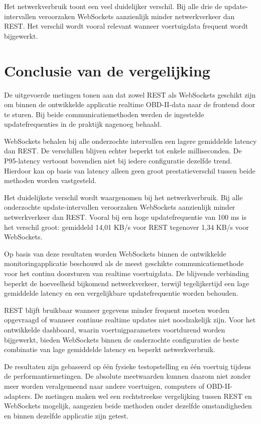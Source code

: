Het netwerkverbruik toont een veel duidelijker verschil. Bij alle drie de
update-intervallen veroorzaken WebSockets aanzienlijk minder netwerkverkeer dan
REST. Het verschil wordt vooral relevant wanneer voertuigdata frequent wordt
bijgewerkt.


\section{Conclusie van de vergelijking}

De uitgevoerde metingen tonen aan dat zowel REST als WebSockets geschikt zijn
om binnen de ontwikkelde applicatie realtime OBD-II-data naar de frontend door
te sturen. Bij beide communicatiemethoden werden de ingestelde
updatefrequenties in de praktijk nagenoeg behaald.

WebSockets behalen bij alle onderzochte intervallen een lagere gemiddelde
latency dan REST. De verschillen blijven echter beperkt tot enkele
milliseconden. De P95-latency vertoont bovendien niet bij iedere configuratie
dezelfde trend. Hierdoor kan op basis van latency alleen geen groot
prestatieverschil tussen beide methoden worden vastgesteld.

Het duidelijkste verschil wordt waargenomen bij het netwerkverbruik. Bij alle
onderzochte update-intervallen veroorzaken WebSockets aanzienlijk minder
netwerkverkeer dan REST. Vooral bij een hoge updatefrequentie van 100 ms is
het verschil groot: gemiddeld 14,01 KB/s voor REST tegenover 1,34 KB/s voor
WebSockets.

Op basis van deze resultaten worden WebSockets binnen de ontwikkelde
monitoringapplicatie beschouwd als de meest geschikte communicatiemethode voor
het continu doorsturen van realtime voertuigdata. De blijvende verbinding
beperkt de hoeveelheid bijkomend netwerkverkeer, terwijl tegelijkertijd een
lage gemiddelde latency en een vergelijkbare updatefrequentie worden behouden.

REST blijft bruikbaar wanneer gegevens minder frequent moeten worden
opgevraagd of wanneer continue realtime updates niet noodzakelijk zijn. Voor
het ontwikkelde dashboard, waarin voertuigparameters voortdurend worden
bijgewerkt, bieden WebSockets binnen de onderzochte configuraties de beste
combinatie van lage gemiddelde latency en beperkt netwerkverbruik.

De resultaten zijn gebaseerd op één fysieke testopstelling en één voertuig
tijdens de performantiemetingen. De absolute meetwaarden kunnen daarom niet
zonder meer worden veralgemeend naar andere voertuigen, computers of
OBD-II-adapters. De metingen maken wel een rechtstreekse vergelijking tussen
REST en WebSockets mogelijk, aangezien beide methoden onder dezelfde
omstandigheden en binnen dezelfde applicatie zijn getest.